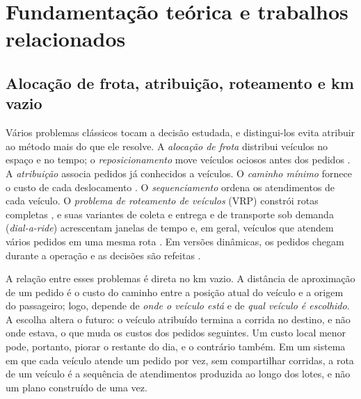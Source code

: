 \section{Fundamentação teórica e trabalhos relacionados}

\subsection{Alocação de frota, atribuição, roteamento e km vazio}

Vários problemas clássicos tocam a decisão estudada, e distingui-los evita atribuir ao método mais do que ele resolve. A \textit{alocação de frota} distribui veículos no espaço e no tempo; o \textit{reposicionamento} move veículos ociosos antes dos pedidos \cite{pavone2012, kontou2020, pouls2025}. A \textit{atribuição} associa pedidos já conhecidos a veículos. O \textit{caminho mínimo} fornece o custo de cada deslocamento \cite{dijkstra1959}. O \textit{sequenciamento} ordena os atendimentos de cada veículo. O \textit{problema de roteamento de veículos} (VRP) constrói rotas completas \cite{toth2002}, e suas variantes de coleta e entrega e de transporte sob demanda (\textit{dial-a-ride}) acrescentam janelas de tempo e, em geral, veículos que atendem vários pedidos em uma mesma rota \cite{cordeau2007, berbeglia2010}. Em versões dinâmicas, os pedidos chegam durante a operação e as decisões são refeitas \cite{pillac2013}.

A relação entre esses problemas é direta no km vazio. A distância de aproximação de um pedido é o custo do caminho entre a posição atual do veículo e a origem do passageiro; logo, depende de \emph{onde o veículo está} e de \emph{qual veículo é escolhido}. A escolha altera o futuro: o veículo atribuído termina a corrida no destino, e não onde estava, o que muda os custos dos pedidos seguintes. Um custo local menor pode, portanto, piorar o restante do dia, e o contrário também. Em um sistema em que cada veículo atende um pedido por vez, sem compartilhar corridas, a rota de um veículo é a sequência de atendimentos produzida ao longo dos lotes, e não um plano construído de uma vez.

